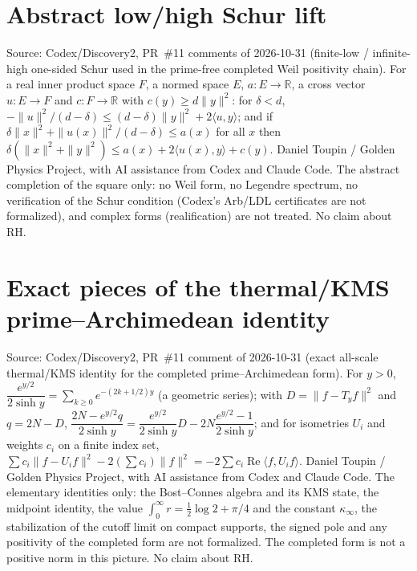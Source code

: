 \documentclass{report}
\theoremstyle{definition}
\begin{document}
\begin{itemize}
\begin{itemize}
\section{Abstract low/high Schur lift}
Source: Codex/Discovery2, PR~\#11 comments of 2026-10-31 (finite-low / infinite-high one-sided Schur used in the prime-free completed Weil positivity chain). For a real inner product space $F$, a normed space $E$, $a:E\to\mathbb R$, a cross vector $u:E\to F$ and $c:F\to\mathbb R$ with $c(y)\ge d\|y\|^2$: for $\delta<d$, $-\|u\|^2/(d-\delta)\le(d-\delta)\|y\|^2+2\langle u,y\rangle$; and if $\delta\|x\|^2+\|u(x)\|^2/(d-\delta)\le a(x)$ for all $x$ then $\delta(\|x\|^2+\|y\|^2)\le a(x)+2\langle u(x),y\rangle+c(y)$.
Daniel Toupin / Golden Physics Project, with AI assistance from Codex and Claude Code. The abstract completion of the square only: no Weil form, no Legendre spectrum, no verification of the Schur condition (Codex's Arb/LDL certificates are not formalized), and complex forms (realification) are not treated. No claim about RH.

\section{Exact pieces of the thermal/KMS prime--Archimedean identity}
Source: Codex/Discovery2, PR~\#11 comment of 2026-10-31 (exact all-scale thermal/KMS identity for the completed prime--Archimedean form). For $y>0$, $\dfrac{e^{y/2}}{2\sinh y}=\sum_{k\ge0}e^{-(2k+1/2)y}$ (a geometric series); with $D=\|f-T_yf\|^2$ and $q=2N-D$, $\dfrac{2N-e^{y/2}q}{2\sinh y}=\dfrac{e^{y/2}}{2\sinh y}D-2N\dfrac{e^{y/2}-1}{2\sinh y}$; and for isometries $U_i$ and weights $c_i$ on a finite index set, $\sum c_i\|f-U_if\|^2-2(\sum c_i)\|f\|^2=-2\sum c_i\operatorname{Re}\langle f,U_if\rangle$.
Daniel Toupin / Golden Physics Project, with AI assistance from Codex and Claude Code. The elementary identities only: the Bost--Connes algebra and its KMS state, the midpoint identity, the value $\int_0^\infty r=\tfrac12\log2+\pi/4$ and the constant $\kappa_\infty$, the stabilization of the cutoff limit on compact supports, the signed pole and any positivity of the completed form are not formalized. The completed form is not a positive norm in this picture. No claim about RH.


\end{itemize}
\end{itemize}
\end{document}
